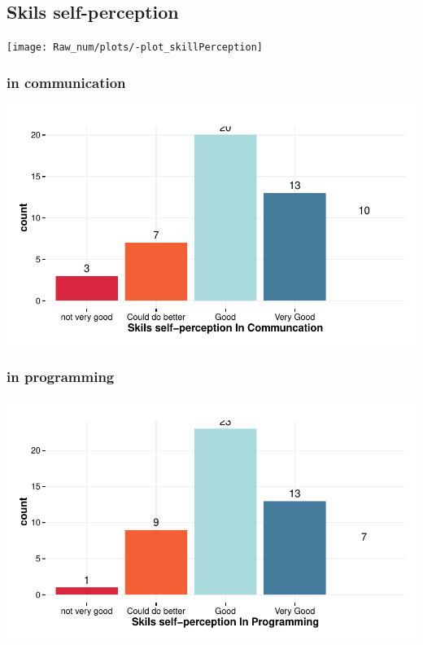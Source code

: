\documentclass{article}
\begin{document}
\subsection{Skils self-perception}

\texttt{[image: Raw\_num/plots/-plot\_skillPerception]}

\subsubsection{in communication}
\includegraphics{Raw_num/plots/-plot_skill_selfp_com}

\subsubsection{in programming}
\includegraphics{Raw_num/plots/-plot_skill_selfp_prog}
\end{document}

